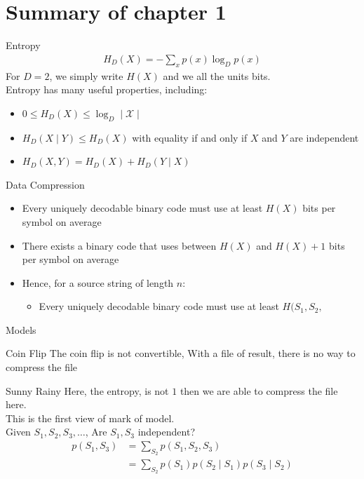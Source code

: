     \section{Summary of chapter 1}
    \begin{parag}{Entropy}
        \begin{align*}
            H_D(X) = - \sum_x p(x)\log_D p(x)
        \end{align*}
        For $D = 2$, we simply write $H(X)$ and we all the units bits.\\
        Entropy has many useful properties, including:
        \begin{itemize}
            \item $0 \leq H_D(X) \leq \log_D \mid \mathcal{X} \mid$
            \item $H_D(X \mid  Y) \leq H_D( X)$ with equality if and only if $X$ and $Y$ are independent
            \item $H_D(X, Y) = H_D(X) + H_D(Y \mid  X)$
        \end{itemize}
        
    \end{parag}
    \begin{parag}{Data Compression}
        \begin{itemize}
            \item Every uniquely decodable binary code must use at least $H(X)$ bits per symbol on average
            \item There exists a binary code that uses between $H(X)$ and $H(X) + 1$ bits per symbol on average
            \item Hence, for a source string of length $n$:
                \begin{itemize}
                    \item Every uniquely decodable binary code must use at least $H(S_1, S_2, $
                \end{itemize}
        \end{itemize}
    
    \end{parag}
   \begin{parag}{Models}
   \begin{subparag}{Coin Flip}
       The coin flip is not convertible, With a file of result, there is no way to compress the file
   \end{subparag}
   \begin{subparag}{Sunny Rainy}
       Here, the entropy, is not $1$ then we are able to compress the file here.\\
       This is the first view of mark of model.\\
       Given $S_1, S_2, S_3, \dots$, Are $S_1, S_3$ independent?
       \\
       \begin{align*}
           p(S_1, S_3) &= \sum_{S_2} p(S_1, S_2, S_3)\\
                       &= \sum_{S_2}p(S_1)p(S_2 \mid S_1)p(S_3 \mid S_2) 
       \end{align*}
       
   \end{subparag}
   \end{parag}
